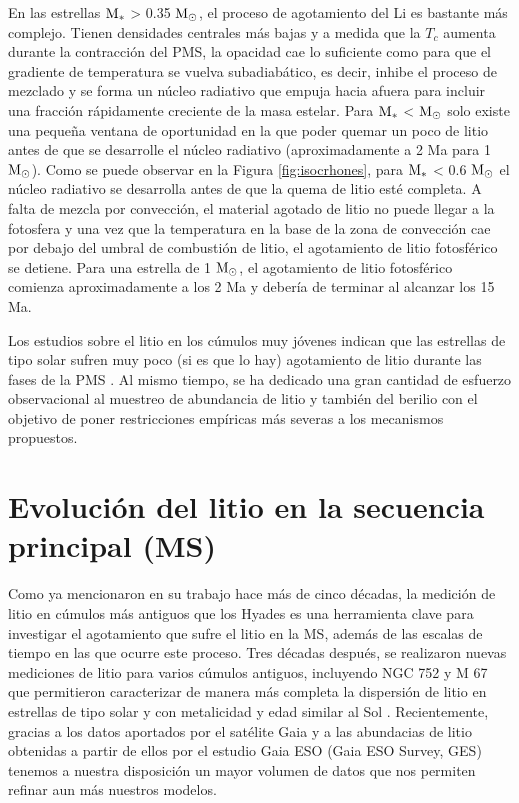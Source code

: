 En las estrellas $\mathrm{M}_*$ > 0.35 $\mathrm{M}_\odot$, el proceso de agotamiento del Li es bastante más complejo. Tienen densidades centrales más bajas y a medida que la $T_c$ aumenta durante la contracción del PMS, la opacidad cae lo suficiente como para que el gradiente de temperatura se vuelva subadiabático, es decir, inhibe el proceso de mezclado y se forma un núcleo radiativo que empuja hacia afuera para incluir una fracción rápidamente creciente de la masa estelar.  Para $\mathrm{M}_*$ <  $\mathrm{M}_\odot$ solo existe una pequeña ventana de oportunidad en la que poder quemar un poco de litio antes de que se desarrolle el núcleo radiativo (aproximadamente a 2 Ma para 1 $\mathrm{M}_\odot$). Como se puede observar en la Figura \ref{fig:isocrhones}, para $\mathrm{M}_*$ < 0.6 $\mathrm{M}_\odot$ el núcleo radiativo se desarrolla antes de que la quema de litio esté completa. A falta de mezcla por convección, el material agotado de litio no puede llegar a la fotosfera y una vez que la temperatura en la base de la zona de convección cae por debajo del umbral de combustión de litio, el agotamiento de litio fotosférico se detiene. Para una estrella de 1 $\mathrm{M}_\odot$, el agotamiento de litio fotosférico comienza aproximadamente a los 2 Ma y debería de terminar al alcanzar los 15 Ma.\par

Los estudios sobre el litio en los cúmulos muy jóvenes indican que las estrellas de tipo solar sufren muy poco (si es que lo hay) agotamiento de litio durante las fases de la PMS  \citep{Jeffries2004}. Al mismo tiempo, se ha dedicado una gran cantidad de esfuerzo observacional al muestreo de abundancia de litio y también del berilio \citep{Mena2011, DelgadoMena2014} con el objetivo de poner restricciones empíricas más severas a los mecanismos propuestos.\par

\section{Evolución del litio en la secuencia principal (MS)}
Como ya mencionaron \cite{Zappala1972} en su trabajo hace más de cinco décadas, la medición de litio en cúmulos más antiguos que los Hyades es una herramienta clave para investigar el agotamiento que sufre el litio en la MS, además de las escalas de tiempo en las que ocurre este proceso. Tres décadas después, se realizaron nuevas mediciones de litio para varios cúmulos antiguos, incluyendo NGC 752 y M 67 \citep{Sestito2006} que permitieron caracterizar de manera más completa la dispersión de litio en estrellas de tipo solar y con metalicidad y edad similar al Sol \citep{Sestito2005}. Recientemente, gracias a los datos aportados por el satélite Gaia \citep{Brown2016, Brown2018, Brown2021, Brown2022} y a las abundacias de litio obtenidas a partir de ellos por el estudio Gaia ESO (Gaia ESO Survey, GES) \citep{Gilmore2012,Randich2013,Randich2022} tenemos a nuestra disposición un mayor volumen de datos que nos permiten refinar aun más nuestros modelos.\par

